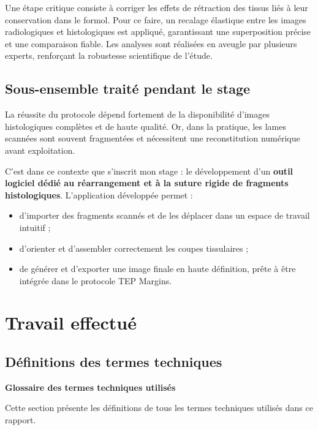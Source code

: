 \documentclass[12pt,a4paper]{report}
\let\oldchapter\chapter
\renewcommand{\chapter}{\clearpage\oldchapter}
\begin{document}
Une étape critique consiste à corriger les effets de rétraction des tissus liés à leur conservation dans le formol. Pour ce faire, un recalage élastique entre les images radiologiques et histologiques est appliqué, garantissant une superposition précise et une comparaison fiable. Les analyses sont réalisées en aveugle par plusieurs experts, renforçant la robustesse scientifique de l'étude.

\section{Sous-ensemble traité pendant le stage}

La réussite du protocole dépend fortement de la disponibilité d'images histologiques complètes et de haute qualité. Or, dans la pratique, les lames scannées sont souvent fragmentées et nécessitent une reconstitution numérique avant exploitation.

C'est dans ce contexte que s'inscrit mon stage : le développement d'un \textbf{outil logiciel dédié au réarrangement et à la suture rigide de fragments histologiques}. L'application développée permet :

\begin{itemize}
\item d'importer des fragments scannés et de les déplacer dans un espace de travail intuitif ;
\item d'orienter et d'assembler correctement les coupes tissulaires ;
\item de générer et d'exporter une image finale en haute définition, prête à être intégrée dans le protocole TEP Margins.
\end{itemize}

\chapter{Travail effectué}

\section{Définitions des termes techniques}

\vspace{1em}

\begin{center}
\textbf{\large Glossaire des termes techniques utilisés}
\end{center}
\vspace{1em}

Cette section présente les définitions de tous les termes techniques utilisés dans ce rapport.
\end{document}
